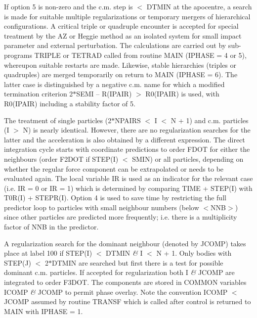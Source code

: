    If option 5 is non-zero and the c.m. step is $<$ DTMIN at the
apocentre, a search is made for suitable multiple regularizations
or temporary mergers of hierarchical configurations. A critical 
triple or quadruple encounter is accepted for special treatment by
the AZ or Heggie method as an isolated system for small impact
parameter and external perturbation. The calculations are carried
out by sub-programs TRIPLE or TETRAD called from routine MAIN 
(IPHASE = 4 or 5), whereupon suitable restarts are made. Likewise, stable
hierarchies (triples or quadruples) are merged temporarily on 
return to MAIN (IPHASE = 6).
The latter case is distinguished by a negative c.m. name for which
a modified termination criterion 2$\ast$SEMI -- R(IPAIR) $>$
R0(IPAIR) is used, with R0(IPAIR) including a stability factor of 5.

 The treatment of single particles (2$\ast$NPAIRS $<$ I $<$ N + 1) and
 c.m. particles (I $>$
 N) is nearly identical.  However, there are no regularization searches for the
 latter and the acceleration is also obtained by a different expression.  The
 direct integration cycle starts with coordinate predictions to order FDOT for
 either the neighbours (order F2DOT if STEP(I) $<$ SMIN) or all particles,
 depending on whether the regular force component can be extrapolated or needs
 to be evaluated again.  The local variable IR is used as an indicator for the
 relevant case (i.e. IR = 0 or IR = 1) which is determined by comparing
 TIME + STEP(I) with T0R(I)
 + STEPR(I).  Option 4 is used to save time by restricting the full predictor
 loop to particles with small neighbour numbers (below $<$NNB$>$) since other
 particles are predicted more frequently; i.e. there is a multiplicity factor of
 NNB in the predictor.

 A regularization search for the dominant neighbour (denoted by JCOMP) takes
 place at label 100 if STEP(I) $<$ DTMIN {\it\&} I $<$ N + 1.  Only bodies with STEP(J)
   $<$ 2$\ast$DTMIN are searched but first there is a test for possible dominant c.m.
 particles.  If accepted for regularization both I {\it\&} JCOMP are integrated to
 order F3DOT.  The components are stored in COMMON variables ICOMP {\it\&} JCOMP to
 permit phase
 overlay.  Note the convention ICOMP $<$ JCOMP assumed by routine TRANSF which is
 called after control is returned to MAIN with IPHASE = 1.

